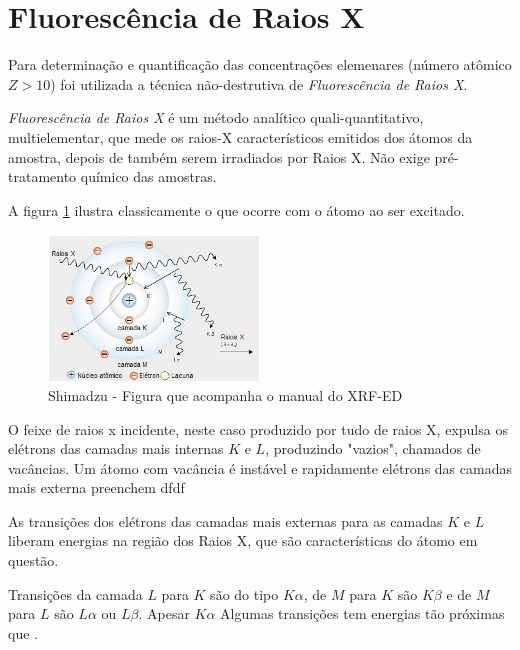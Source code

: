 \section{Fluorescência de Raios X}

Para determinação e quantificação das concentrações elemenares (número atômico $Z>10$)
foi utilizada a técnica não-destrutiva de \textit{Fluorescência de Raios X}.

\textit{Fluorescência de Raios X} é um método analítico quali-quantitativo, 
multielementar, que mede os raios-X característicos emitidos dos átomos da amostra, 
depois de também serem irradiados por Raios X. Não exige pré-tratamento químico
das amostras.

A figura \ref{fig:shimadzu_atomo} ilustra classicamente o que ocorre com
o átomo ao ser excitado.

\begin{figure}[H]
\begin{center} 
  \includegraphics[width=0.5\textwidth]{../inputs/images/shimadzu_atomo.jpg}
  \caption{Shimadzu - Figura que acompanha o manual do XRF-ED \label{fig:shimadzu_atomo}}
\end{center}
\end{figure}

O feixe de raios x incidente, neste caso produzido por tudo de raios X, 
expulsa os elétrons das camadas mais internas $K$ e $L$, produzindo 
"vazios", chamados de vacâncias. Um átomo com vacância é instável e
rapidamente elétrons das camadas mais externa preenchem  dfdf

As transições dos elétrons das camadas mais externas para as camadas
$K$ e $L$ liberam energias na região dos Raios X, que são características
do átomo em questão. 

Transições da camada $L$ para $K$ são do tipo $K\alpha$, de $M$ para $K$ 
são $K\beta$ e de $M$ para $L$ são $L\alpha$ ou $L\beta$. 
Apesar $K\alpha$  Algumas transições tem 
energias tão próximas que .


